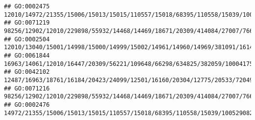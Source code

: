 \documentclass[
]{article}
\begin{document}
\begin{verbatim}
## GO:0002475                                                                                                                                                                                                                                                                                                             12010/14972/21355/15006/15013/15015/110557/15018/68395/110558/15039/100529082/15024/667977/14990
## GO:0071219                                                                                                                                                          98256/12902/12010/229898/55932/14468/14469/18671/20309/414084/27007/76681/434219/20128/209387/66298/634825/382059/100041759/13237/13239/626682/626708/100041952/503491/17394/81897/16160/327957/18126/22169/17079/100503545/12475/12511/60533/58205
## GO:0002504                                                                                                                                                                                                                                                                                                                                     12010/13040/15001/14998/15000/14999/15002/14961/14960/14969/381091/16149
## GO:0061844                                                                                                                                                                                                                                          16963/14061/12010/16447/20309/56221/109648/66298/634825/382059/100041759/13237/13239/626682/626708/100041952/503491/20299/20295/20306/20307/20304/20303/56838/78416
## GO:0042102                                                                                                                                                                                                                                                                              12487/16963/18761/16184/20423/24099/12501/16160/20304/12775/20533/72049/320484/15000/14999/547431/11629/12511/60533/58205/20371
## GO:0071216                                                                                                                                                    98256/12902/12010/229898/55932/14468/14469/18671/20309/414084/27007/76681/434219/20128/209387/66298/634825/382059/100041759/13237/13239/626682/626708/100041952/503491/17394/81897/16160/327957/18126/22169/17079/100503545/12475/12511/60533/58205/12229
## GO:0002476                                                                                                                                                                                                                                                                                                                   14972/21355/15006/15013/15015/110557/15018/68395/110558/15039/100529082/15024/667977/14990

\end{verbatim}
\end{document}
